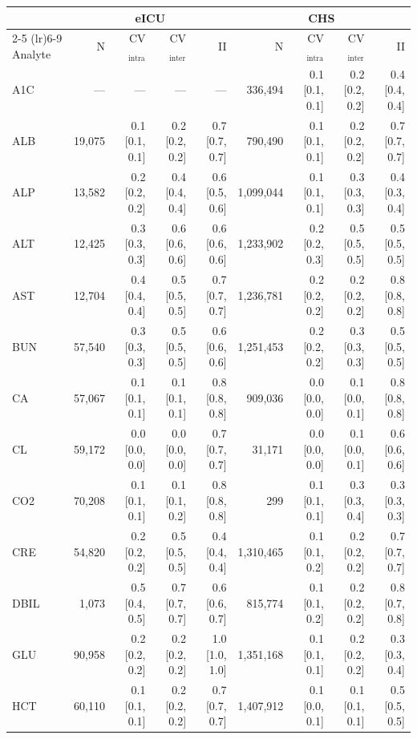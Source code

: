 \begin{table}[ht]
\centering
\footnotesize
\begin{tabular}{lrrrrrrrr}
\toprule
  & \multicolumn{4}{c}{eICU} & \multicolumn{4}{c}{CHS} \\
\cmidrule(lr){2-5} \cmidrule(lr){6-9}
Analyte & N & CV$_{\text{intra}}$ & CV$_{\text{inter}}$ & II & N & CV$_{\text{intra}}$ & CV$_{\text{inter}}$ & II \\
\midrule
A1C & --- & --- & --- & --- & 336,494 & 0.1 [0.1, 0.1] & 0.2 [0.2, 0.2] & 0.4 [0.4, 0.4] \\
ALB & 19,075 & 0.1 [0.1, 0.1] & 0.2 [0.2, 0.2] & 0.7 [0.7, 0.7] & 790,490 & 0.1 [0.1, 0.1] & 0.2 [0.2, 0.2] & 0.7 [0.7, 0.7] \\
ALP & 13,582 & 0.2 [0.2, 0.2] & 0.4 [0.4, 0.4] & 0.6 [0.5, 0.6] & 1,099,044 & 0.1 [0.1, 0.1] & 0.3 [0.3, 0.3] & 0.4 [0.3, 0.4] \\
ALT & 12,425 & 0.3 [0.3, 0.3] & 0.6 [0.6, 0.6] & 0.6 [0.6, 0.6] & 1,233,902 & 0.2 [0.2, 0.3] & 0.5 [0.5, 0.5] & 0.5 [0.5, 0.5] \\
AST & 12,704 & 0.4 [0.4, 0.4] & 0.5 [0.5, 0.5] & 0.7 [0.7, 0.7] & 1,236,781 & 0.2 [0.2, 0.2] & 0.2 [0.2, 0.2] & 0.8 [0.8, 0.8] \\
BUN & 57,540 & 0.3 [0.3, 0.3] & 0.5 [0.5, 0.5] & 0.6 [0.6, 0.6] & 1,251,453 & 0.2 [0.2, 0.2] & 0.3 [0.3, 0.3] & 0.5 [0.5, 0.5] \\
CA & 57,067 & 0.1 [0.1, 0.1] & 0.1 [0.1, 0.1] & 0.8 [0.8, 0.8] & 909,036 & 0.0 [0.0, 0.0] & 0.1 [0.0, 0.1] & 0.8 [0.8, 0.8] \\
CL & 59,172 & 0.0 [0.0, 0.0] & 0.0 [0.0, 0.0] & 0.7 [0.7, 0.7] & 31,171 & 0.0 [0.0, 0.0] & 0.1 [0.0, 0.1] & 0.6 [0.6, 0.6] \\
CO2 & 70,208 & 0.1 [0.1, 0.1] & 0.1 [0.1, 0.2] & 0.8 [0.8, 0.8] & 299 & 0.1 [0.1, 0.1] & 0.3 [0.3, 0.4] & 0.3 [0.3, 0.3] \\
CRE & 54,820 & 0.2 [0.2, 0.2] & 0.5 [0.5, 0.5] & 0.4 [0.4, 0.4] & 1,310,465 & 0.1 [0.1, 0.2] & 0.2 [0.2, 0.2] & 0.7 [0.7, 0.7] \\
DBIL & 1,073 & 0.5 [0.4, 0.5] & 0.7 [0.7, 0.7] & 0.6 [0.6, 0.7] & 815,774 & 0.1 [0.1, 0.2] & 0.2 [0.2, 0.2] & 0.8 [0.7, 0.8] \\
GLU & 90,958 & 0.2 [0.2, 0.2] & 0.2 [0.2, 0.2] & 1.0 [1.0, 1.0] & 1,351,168 & 0.1 [0.1, 0.1] & 0.2 [0.2, 0.2] & 0.3 [0.3, 0.4] \\
HCT & 60,110 & 0.1 [0.1, 0.1] & 0.2 [0.2, 0.2] & 0.7 [0.7, 0.7] & 1,407,912 & 0.1 [0.0, 0.1] & 0.1 [0.1, 0.1] & 0.5 [0.5, 0.5] \\

\end{tabular}
\end{table}
